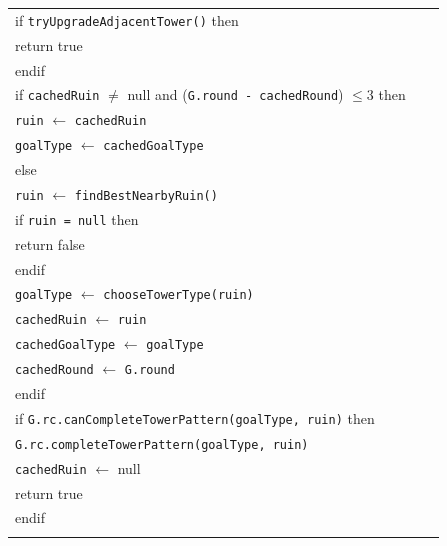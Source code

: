 \documentclass{article}
\newenvironment{pseudobox}
{
\centering
\begin{longtable}{|p{0.94\linewidth}|}
\hline
}
{
\\ \hline
\end{longtable}
\vspace{0.05cm}
}
\begin{document}
\begin{enumerate}[label=\alph*.]
\begin{enumerate}[label=\alph*.]
\begin{pseudobox}
\hspace*{1.5em}if \texttt{tryUpgradeAdjacentTower()} then \\
\hspace*{3em}return true \\
\hspace*{1.5em}endif \\

\hspace*{1.5em}if \texttt{cachedRuin} $\neq$ null and (\texttt{G.round - cachedRound}) $\leq 3$ then \\
\hspace*{3em}\texttt{ruin} $\leftarrow$ \texttt{cachedRuin} \\
\hspace*{3em}\texttt{goalType} $\leftarrow$ \texttt{cachedGoalType} \\
\hspace*{1.5em}else \\
\hspace*{3em}\texttt{ruin} $\leftarrow$ \texttt{findBestNearbyRuin()} \\
\hspace*{3em}if \texttt{ruin = null} then \\
\hspace*{4.5em}return false \\
\hspace*{3em}endif \\

\hspace*{3em}\texttt{goalType} $\leftarrow$ \texttt{chooseTowerType(ruin)} \\
\hspace*{3em}\texttt{cachedRuin} $\leftarrow$ \texttt{ruin} \\
\hspace*{3em}\texttt{cachedGoalType} $\leftarrow$ \texttt{goalType} \\
\hspace*{3em}\texttt{cachedRound} $\leftarrow$ \texttt{G.round} \\
\hspace*{1.5em}endif \\

\hspace*{1.5em}if \texttt{G.rc.canCompleteTowerPattern(goalType, ruin)} then \\
\hspace*{3em}\texttt{G.rc.completeTowerPattern(goalType, ruin)} \\
\hspace*{3em}\texttt{cachedRuin} $\leftarrow$ null \\
\hspace*{3em}return true \\
\hspace*{1.5em}endif \\


\end{pseudobox}
\end{enumerate}
\end{enumerate}
\end{document}
